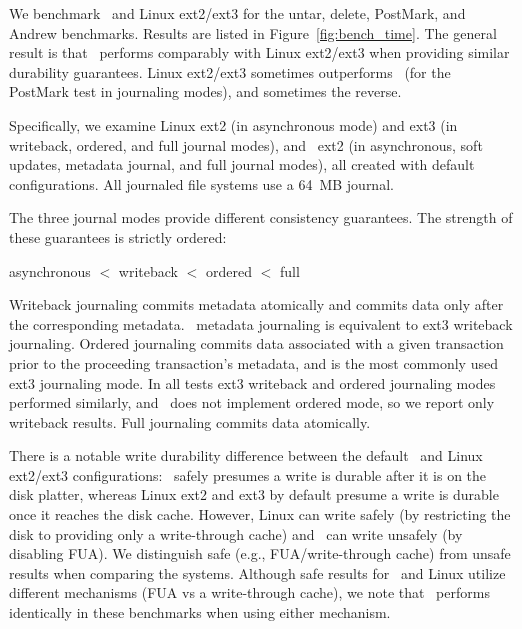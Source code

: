 We benchmark \Kudos\ and Linux ext2/ext3 for the untar, delete,
PostMark, and Andrew benchmarks. Results are listed in
Figure~\ref{fig:bench_time}.
%
The general result is that \Kudos\ performs comparably with Linux
ext2/ext3 when providing similar durability guarantees. Linux
ext2/ext3 sometimes outperforms \Kudos\ (for the PostMark test in
journaling modes), and sometimes the reverse.

Specifically, we examine Linux ext2 (in asynchronous mode) and ext3
(in writeback, ordered, and full journal modes), and \Kudos\ ext2 (in
asynchronous, soft updates, metadata journal, and full journal modes),
all created with default configurations. All journaled file systems
use a 64~MB journal.

The three journal modes provide different consistency guarantees.
The strength of these guarantees is strictly ordered:
\vspace{-0.5\baselineskip}
\begin{center}
asynchronous $<$ writeback $<$ ordered $<$ full
\end{center}
\vspace{-0.5\baselineskip}
Writeback journaling commits metadata atomically and commits data only
after the corresponding metadata. \Kudos\ metadata journaling is
equivalent to ext3 writeback journaling.
%
Ordered journaling commits data associated with a given transaction
prior to the proceeding transaction's metadata, and is the most
commonly used ext3 journaling mode.
%
In all tests ext3 writeback and ordered journaling modes performed
similarly, and \Kudos\ does not implement ordered mode, so we report
only writeback results.
%
Full journaling commits data atomically.

There is a notable write durability difference between the default
\Kudos\ and Linux ext2/ext3 configurations: \Kudos\ safely presumes a write
is durable after it is on the disk platter, whereas Linux ext2 and
ext3 by default presume a write is durable once it reaches the disk cache.
However, Linux can write safely (by restricting the disk to providing only
a write-through cache) and \Kudos\ can write unsafely (by disabling FUA).
%
We distinguish safe (e.g., FUA/write-through cache) from unsafe results
when comparing the systems.
%
Although safe results for \Kudos\ and Linux utilize different
mechanisms (FUA vs a write-through cache), we note that \Kudos\
performs identically in these benchmarks when using either mechanism.

\benchtable{}

